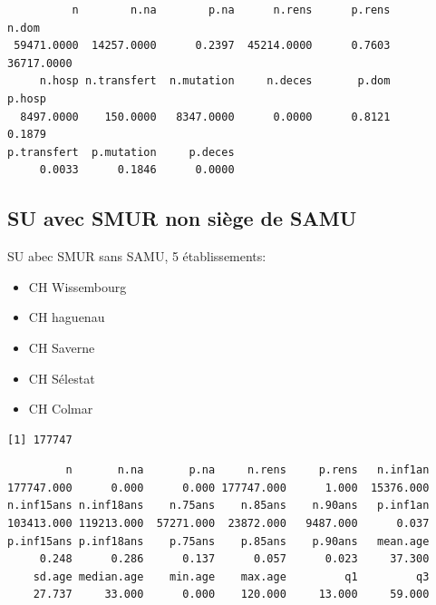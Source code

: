 \documentclass[]{article}
\newenvironment{Shaded}{\begin{snugshade}}{\end{snugshade}}
\newcommand{\KeywordTok}[1]{\textcolor[rgb]{0.13,0.29,0.53}{\textbf{{#1}}}}
\newcommand{\StringTok}[1]{\textcolor[rgb]{0.31,0.60,0.02}{{#1}}}
\newcommand{\CommentTok}[1]{\textcolor[rgb]{0.56,0.35,0.01}{\textit{{#1}}}}
\newcommand{\NormalTok}[1]{{#1}}
\begin{document}
\begin{verbatim}
          n        n.na        p.na      n.rens      p.rens       n.dom 
 59471.0000  14257.0000      0.2397  45214.0000      0.7603  36717.0000 
     n.hosp n.transfert  n.mutation     n.deces       p.dom      p.hosp 
  8497.0000    150.0000   8347.0000      0.0000      0.8121      0.1879 
p.transfert  p.mutation     p.deces 
     0.0033      0.1846      0.0000 
\end{verbatim}

\subsection{SU avec SMUR non siège de
SAMU}\label{su-avec-smur-non-siege-de-samu}

SU abec SMUR sans SAMU, 5 établissements:

\begin{itemize}
\itemsep1pt\parskip0pt
\item
  CH Wissembourg
\item
  CH haguenau
\item
  CH Saverne
\item
  CH Sélestat
\item
  CH Colmar
\end{itemize}

\begin{Shaded}
\end{Shaded}

\begin{verbatim}
[1] 177747
\end{verbatim}

\begin{Shaded}
\end{Shaded}

\begin{verbatim}
         n       n.na       p.na     n.rens     p.rens   n.inf1an 
177747.000      0.000      0.000 177747.000      1.000  15376.000 
n.inf15ans n.inf18ans    n.75ans    n.85ans    n.90ans   p.inf1an 
103413.000 119213.000  57271.000  23872.000   9487.000      0.037 
p.inf15ans p.inf18ans    p.75ans    p.85ans    p.90ans   mean.age 
     0.248      0.286      0.137      0.057      0.023     37.300 
    sd.age median.age    min.age    max.age         q1         q3 
    27.737     33.000      0.000    120.000     13.000     59.000 
\end{verbatim}
\end{document}
